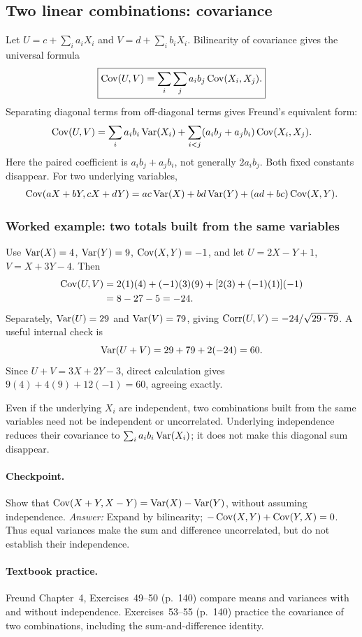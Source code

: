 \subsection{Two linear combinations: covariance}
Let
$U=c+\sum_i a_iX_i$ and $V=d+\sum_i b_iX_i$. Bilinearity of covariance gives the universal formula
\[
\boxed{\operatorname{Cov}(U,V)=\sum_i\sum_j a_i b_j\operatorname{Cov}(X_i,X_j).}
\]
Separating diagonal terms from off-diagonal terms gives Freund's equivalent form:
\[
\operatorname{Cov}(U,V)=\sum_i a_i b_i\operatorname{Var}(X_i)
 +\sum_{i<j}(a_i b_j+a_j b_i)\operatorname{Cov}(X_i,X_j).
\]
Here the paired coefficient is $a_i b_j+a_j b_i$, not generally $2a_i b_j$. Both fixed constants disappear. For two underlying variables,
\[
\begin{aligned}
\operatorname{Cov}(aX+bY,cX+dY)
=ac\operatorname{Var}(X)+bd\operatorname{Var}(Y)+(ad+bc)\operatorname{Cov}(X,Y).
\end{aligned}
\]

\subsubsection*{Worked example: two totals built from the same variables}
Use $\operatorname{Var}(X)=4$, $\operatorname{Var}(Y)=9$, $\operatorname{Cov}(X,Y)=-1$, and let
$U=2X-Y+1$, $V=X+3Y-4$. Then
\[
\begin{aligned}
\operatorname{Cov}(U,V)
 &=2(1)(4)+(-1)(3)(9)+[2(3)+(-1)(1)](-1)\\
 &=8-27-5=-24.
\end{aligned}
\]
Separately, $\operatorname{Var}(U)=29$ and $\operatorname{Var}(V)=79$, giving
$\operatorname{Corr}(U,V)=-24/\sqrt{29\cdot79}$. A useful internal check is
\[
 \operatorname{Var}(U+V)=29+79+2(-24)=60.
\]
Since $U+V=3X+2Y-3$, direct calculation gives $9(4)+4(9)+12(-1)=60$, agreeing exactly.

Even if the underlying $X_i$ are independent, two combinations built from the same variables need not be independent or uncorrelated. Underlying independence reduces their covariance to $\sum_i a_i b_i\operatorname{Var}(X_i)$; it does not make this diagonal sum disappear.

\paragraph{Checkpoint.} Show that $\operatorname{Cov}(X+Y,X-Y)=\operatorname{Var}(X)-\operatorname{Var}(Y)$, without assuming independence. \emph{Answer:} Expand by bilinearity; $-\operatorname{Cov}(X,Y)+\operatorname{Cov}(Y,X)=0$. Thus equal variances make the sum and difference uncorrelated, but do not establish their independence.

\paragraph{Textbook practice.} Freund Chapter~4, Exercises~49--50 (p.~140) compare means and variances with and without independence. Exercises~53--55 (p.~140) practice the covariance of two combinations, including the sum-and-difference identity.

